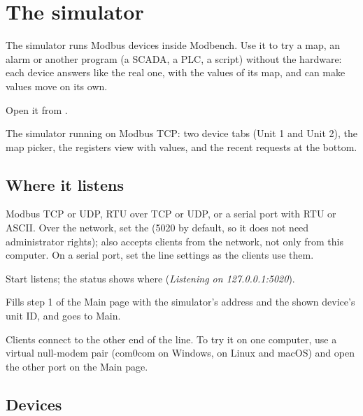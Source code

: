 \chapter{The simulator}
\label{ch:simulator}

The simulator runs Modbus devices inside Modbench. Use it to try a map, an
alarm or another program (a SCADA, a PLC, a script) without the hardware:
each device answers like the real one, with the values of its map, and can
make values move on its own.

Open it from .

  {The simulator running on Modbus TCP: two device tabs (Unit 1 and Unit 2),
   the map picker, the registers view with values, and the recent requests at
   the bottom.}

\section{Where it listens}

\begin{description}[style=nextline, leftmargin=0pt, font=\intermedium]
  \item[Interface] Modbus TCP or UDP, RTU over TCP or UDP, or a serial port
    with RTU or ASCII. Over the network, set the  (5020 by
    default, so it does not need administrator rights);  also accepts clients from the network, not only from this
    computer. On a serial port, set the line settings as the clients use them.
  \item[\uiaccent{Start} and \ui{Stop}] Start listens; the status shows where
    (\emph{Listening on 127.0.0.1:5020}).
  \item[\ui{Connect Main to it}] Fills step 1 of the Main page with the
    simulator's address and the shown device's unit ID, and goes to Main.
\end{description}

\begin{note}[Serial]
Clients connect to the other end of the line. To try it on one computer, use
a virtual null-modem pair (com0com on Windows,  on Linux and macOS)
and open the other port on the Main page.
\end{note}

\section{Devices}

